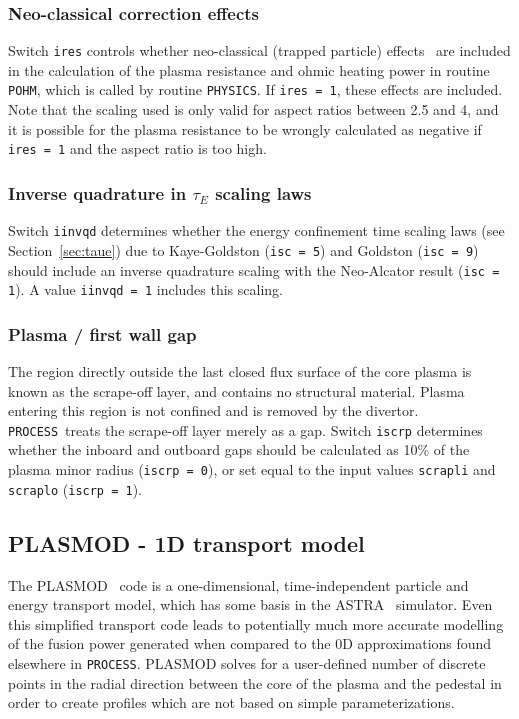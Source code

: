 \documentclass[11pt,a4paper]{report}
\newcommand{\process}{\mbox{\texttt{PROCESS}}}
\begin{document}
\subsubsection*{Neo-classical correction effects}

Switch \texttt{ires} controls whether neo-classical (trapped particle) 
effects~\cite{Uckan} are included in the calculation of the plasma resistance
and ohmic heating power in routine \texttt{POHM}, which is called by routine
\texttt{PHYSICS}. If \texttt{ires = 1}, these effects are included. Note that
the scaling used is only valid for aspect ratios between 2.5 and 4, and it is
possible for the plasma resistance to be wrongly calculated as negative if
\texttt{ires = 1} and the aspect ratio is too high.

\subsubsection*{Inverse quadrature in $\tau_E$ scaling laws}

Switch \texttt{iinvqd} determines whether the energy confinement time scaling
laws (see Section~\ref{sec:taue}) due to Kaye-Goldston (\texttt{isc = 5}) and
Goldston (\texttt{isc = 9}) should include an inverse quadrature scaling with
the Neo-Alcator result (\texttt{isc = 1}). A value \texttt{iinvqd = 1}
includes this scaling.

\subsubsection*{Plasma / first wall gap}

The region directly outside the last closed flux surface of the core plasma is
known as the scrape-off layer, and contains no structural material.  Plasma
entering this region is not confined and is removed by the divertor. \process\
treats the scrape-off layer merely as a gap. Switch \texttt{iscrp} determines
whether the inboard and outboard gaps should be calculated as 10\% of the
plasma minor radius (\texttt{iscrp = 0}), or set equal to the input values
\texttt{scrapli} and \texttt{scraplo} (\texttt{iscrp = 1}).

\subsection{PLASMOD - 1D transport model}
\label{sec:plasmod}

The PLASMOD~\cite{PLASMOD} code is a one-dimensional, time-independent particle and energy transport model, which has some basis in the ASTRA~\cite{ASTRA} simulator. Even this simplified transport code leads to potentially much more accurate modelling of the fusion power generated when compared to the 0D approximations found elsewhere in \process. PLASMOD solves for a user-defined number of discrete points in the radial direction between the core of the plasma and the pedestal in order to create profiles which are not based on simple parameterizations.
\end{document}
